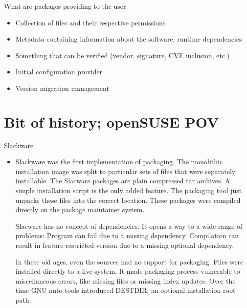 \documentclass{beamer}
\begin{document}
\begin{frame}[t]{What are packages providing to the user}
	\begin{itemize}
	\item Collection of files and their respective permissions
	\item Metadata containing information about the software, runtime dependencies
	\item Something that can be verified (vendor, signature, CVE inclusion, etc.)
	\item Initial configuration provider
	\item Version migration management
	\end{itemize}
\end{frame}

\section{Bit of history; openSUSE POV}

\begin{frame}[t]{Slackware}
	\begin{itemize}
	\item Slackware was the first implementation of packaging. The monolithic installation image was split to particular sets of files that were separately installable. The Slacware packages are plain compressed tar archives. A simple installation script is the only added feature. The packaging tool just unpacks these files into the correct location. These packages were compiled directly on the package maintainer system.

Slacware has no concept of dependencies. It opens a way to a wide range of problems: Program can fail due to a missing dependency. Compilation can result in feature-restricted version due to a missing optional dependency.

In these old ages, even the sources had no support for packaging. Files were installed directly to a live system. It made packaging process vulnerable to miscellaneous errors, like missing files or missing index updates. Over the time GNU auto tools introduced DESTDIR: an optional installation root path.
	    
	\end{itemize}
\end{frame}
\end{document}
